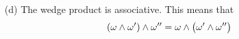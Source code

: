 \begin{defn}
\begin{enumerate}[(a)]



\end{enumerate}
\end{defn}

\addtocounter{theorem}{-1}
\begin{defn}[continued]
\begin{enumerate}[(a)]

\item[(d)] %
The wedge product is associative. This means that
\begin{equation*}
(\omega\wedge\omega')\wedge\omega''=\omega\wedge\big(\omega'\wedge\omega''\big)
\end{equation*}

\end{enumerate}
\end{defn}


%
%

